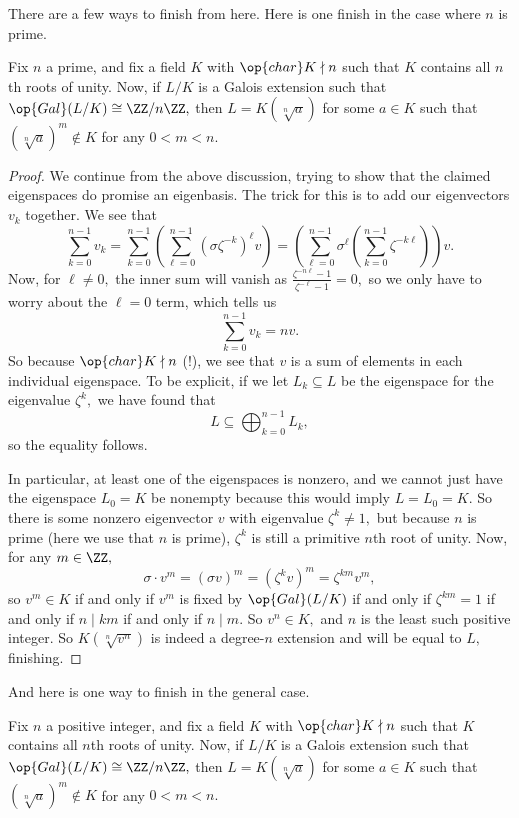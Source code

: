 \documentclass[../notes.tex]{subfiles}
\begin{document}
There are a few ways to finish from here. Here is one finish in the case where $n$ is prime.
\begin{theorem}
	Fix $n$ a prime, and fix a field $K$ with $\op{char}K\nmid n$ such that $K$ contains all $n$th roots of unity. Now, if $L/K$ is a Galois extension such that $\op{Gal}(L/K)\cong\ZZ/n\ZZ,$ then $L=K(\sqrt[n]a)$ for some $a\in K$ such that $(\sqrt[n]a)^m\notin K$ for any $0<m<n.$
\end{theorem}
\begin{proof}
	We continue from the above discussion, trying to show that the claimed eigenspaces do promise an eigenbasis. The trick for this is to add our eigenvectors $v_k$ together. We see that
	\[\sum_{k=0}^{n-1}v_k=\sum_{k=0}^{n-1}\left(\sum_{\ell=0}^{n-1}\left(\sigma\zeta^{-k}\right)^\ell v\right)=\left(\sum_{\ell=0}^{n-1}\sigma^\ell\left(\sum_{k=0}^{n-1}\zeta^{-k\ell}\right)\right)v.\]
	Now, for $\ell\ne0,$ the inner sum will vanish as $\frac{\zeta^{-n\ell}-1}{\zeta^{-\ell}-1}=0,$ so we only have to worry about the $\ell=0$ term, which tells us
	\[\sum_{k=0}^{n-1}v_k=nv.\]
	So because $\op{char}K\nmid n$ (!), we see that $v$ is a sum of elements in each individual eigenspace. To be explicit, if we let $L_k\subseteq L$ be the eigenspace for the eigenvalue $\zeta^k,$ we have found that
	\[L\subseteq\bigoplus_{k=0}^{n-1}L_k,\]
	so the equality follows.
	
	In particular, at least one of the eigenspaces is nonzero, and we cannot just have the eigenspace $L_0=K$ be nonempty because this would imply $L=L_0=K.$ So there is some nonzero eigenvector $v$ with eigenvalue $\zeta^k\ne1,$ but because $n$ is prime (here we use that $n$ is prime), $\zeta^k$ is still a primitive $n$th root of unity. Now, for any $m\in\ZZ,$
	\[\sigma\cdot v^m=(\sigma v)^m=(\zeta^k v)^m=\zeta^{km}v^m,\]
	so $v^m\in K$ if and only if $v^m$ is fixed by $\op{Gal}(L/K)$ if and only if $\zeta^{km}=1$ if and only if $n\mid km$ if and only if $n\mid m.$ So $v^n\in K,$ and $n$ is the least such positive integer. So $K(\sqrt[n]{v^n})$ is indeed a degree-$n$ extension and will be equal to $L,$ finishing.
\end{proof}
And here is one way to finish in the general case.
\begin{theorem} \label{thm:kummerchar0}
	Fix $n$ a positive integer, and fix a field $K$ with $\op{char}K\nmid n$ such that $K$ contains all $n$th roots of unity. Now, if $L/K$ is a Galois extension such that $\op{Gal}(L/K)\cong\ZZ/n\ZZ,$ then $L=K(\sqrt[n]a)$ for some $a\in K$ such that $(\sqrt[n]a)^m\notin K$ for any $0<m<n.$
\end{theorem}
\end{document}

